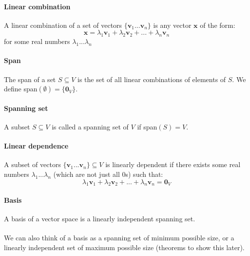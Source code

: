 \documentclass{scrartcl}
\renewcommand{\vec}[1]{\mathbf{#1}}
\begin{document}
\paragraph{Linear combination}
A linear combination of a set of vectors $ \{\vec{v}_{1}...\vec{v}_{n}\} $ is any vector $ \vec{x} $ of the form:
\begin{equation}
\vec{x} = \lambda_{1}\vec{v}_{1} + \lambda_{2}\vec{v}_{2} + ... + \lambda_{n}\vec{v}_{n}
\end{equation}
for some real numbers $ \lambda_{1}...\lambda_{n} $
\paragraph{Span}
The span of a set $ S \subseteq V $ is the set of all linear combinations of elements of $ S $. We define span$ (\emptyset) = \{\vec{0}_{V}\} $.
\paragraph{Spanning set}
A subset $ S \subseteq V $ is called a spanning set of $ V $ if span$ (S) = V $.
\paragraph{Linear dependence}
A subset of vectors $ \{ \vec{v}_{1}...\vec{v}_{n} \}  \subseteq V $ is linearly dependent if there exists some real numbers $ \lambda_{1}...\lambda_{n} $ (which are not just all $ 0 $s) such that:
\begin{equation}
\lambda_{1}\vec{v}_{1} + \lambda_{2}\vec{v}_{2} + ... + \lambda_{n}\vec{v}_{n} = \vec{0}_{V}
\end{equation}
\paragraph{Basis}
A basis of a vector space is a linearly independent spanning set.
\\\\
We can also think of a basis as a spanning set of minimum possible size, or a linearly independent set of maximum possible size (theorems to show this later).
\end{document}
